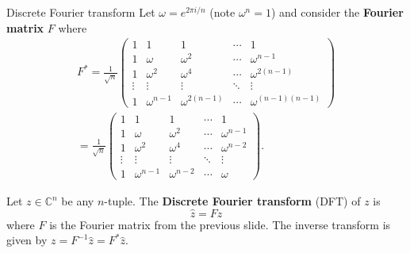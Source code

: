 \documentclass[mathserif
, handout
]{beamer}
\begin{document}
\begin{frame}{Discrete Fourier transform}
    Let $\omega = e^{2\pi i/n}$ (note $\omega^n = 1$) and consider the \textbf{Fourier matrix} $F$ where 
    \begin{multline*}
        F^\ast = \frac{1}{\sqrt{n}}\begin{pmatrix}
        1 & 1 & 1 & \cdots & 1 \\
        1 & \omega & \omega^2 & \cdots & \omega^{n-1}\\
        1 & \omega^2 & \omega^4 & \cdots & \omega^{2(n-1)}\\
        \vdots & \vdots & \vdots & \ddots & \vdots\\
        1 & \omega^{n-1} & \omega^{2(n-1)} & \cdots & \omega^{(n-1)(n-1)}
    \end{pmatrix} \\ = \frac{1}{\sqrt{n}}\begin{pmatrix}
        1 & 1 & 1 & \cdots & 1 \\
        1 & \omega & \omega^2 & \cdots & \omega^{n-1}\\
        1 & \omega^2 & \omega^4 & \cdots & \omega^{n-2}\\
        \vdots & \vdots & \vdots & \ddots & \vdots\\
        1 & \omega^{n-1} & \omega^{n-2} & \cdots & \omega^{}
    \end{pmatrix}.
    \end{multline*} 
\end{frame}

\begin{frame}{}
    Let $z \in \mathbb C^n$ be any $n$-tuple. The \textbf{Discrete Fourier transform} (DFT) of $z$ is 
    \[\hat z = Fz\] where $F$ is the Fourier matrix from the previous slide. The inverse transform is given by $z = F^{-1}\hat z = F^\ast\hat z$.
\end{frame}

\begin{frame}{}

\end{frame}

\begin{frame}{}

\end{frame}

\begin{frame}{}

\end{frame}

\begin{frame}{}

\end{frame}
\end{document}
